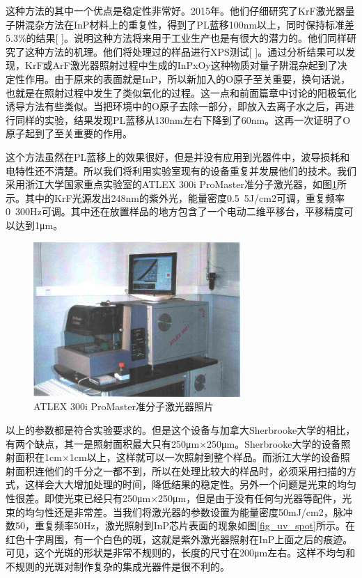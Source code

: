 \documentclass{ZJUthesis}
\begin{document}
这种方法的其中一个优点是稳定性非常好。2015年。他们仔细研究了KrF激光器量子阱混杂方法在InP材料上的重复性，得到了PL蓝移100nm以上，同时保持标准差5.3\%的结果[ ]。说明这种方法将来用于工业生产也是有很大的潜力的。他们同样研究了这种方法的机理。他们将处理过的样品进行XPS测试[ ]。通过分析结果可以发现，KrF或ArF激光器照射过程中生成的InPxOy这种物质对量子阱混杂起到了决定性作用。由于原来的表面就是InP，所以新加入的O原子至关重要，换句话说，也就是在照射过程中发生了类似氧化的过程。这一点和前面篇章中讨论的阳极氧化诱导方法有些类似。当把环境中的O原子去除一部分，即放入去离子水之后，再进行同样的实验，结果发现PL蓝移从130nm左右下降到了60nm。这再一次证明了O原子起到了至关重要的作用。

这个方法虽然在PL蓝移上的效果很好，但是并没有应用到光器件中，波导损耗和电特性还不清楚。所以我们将利用实验室现有的设备重复并发展他们的技术。我们采用浙江大学国家重点实验室的ATLEX 300i ProMaster准分子激光器，如图\ref{fig_promaster}所示。其中的KrF光源发出248nm的紫外光，能量密度0.5~5J/cm2可调，重复频率0~300Hz可调。其中还在放置样品的地方包含了一个电动二维平移台，平移精度可以达到1μm。

\begin{figure}[!t]
    \centering
    \includegraphics[width=0.7\textwidth]{./Pictures/promaster.eps}
    \caption{ATLEX 300i ProMaster准分子激光器照片}
    \label{fig_promaster}
\end{figure}

以上的参数都是符合实验要求的。但是这个设备与加拿大Sherbrooke大学的相比，有两个缺点，其一是照射面积最大只有250μm×250μm。Sherbrooke大学的设备照射面积在1cm×1cm以上，这样就可以一次照射到整个样品。而浙江大学的设备照射面积连他们的千分之一都不到，所以在处理比较大的样品时，必须采用扫描的方式，这样会大大增加处理的时间，降低结果的稳定性。另外一个问题是光束的均匀性很差。即使光束已经只有250μm×250μm，但是由于没有任何匀光器等配件，光束的均匀性还是非常差。当我们将激光器的参数设置为能量密度50mJ/cm2，脉冲数50，重复频率50Hz，激光照射到InP芯片表面的现象如图\ref{fig_uv_spot}所示。在红色十字周围，有一个白色的斑，这就是紫外激光器照射在InP上面之后的痕迹。可见，这个光斑的形状是非常不规则的，长度的尺寸在200μm左右。这样不均匀和不规则的光斑对制作复杂的集成光器件是很不利的。
\end{document}
